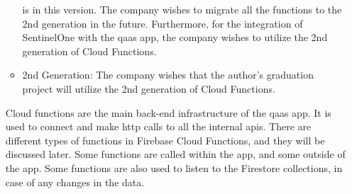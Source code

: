 \begin{itemize}
\begin{itemize}
                        is in this version. The company wishes to migrate all the functions to the 2nd generation in
                        the future. Furthermore, for the integration of SentinelOne with the \acrshort{qaas} app, the
                        company wishes to utilize the 2nd generation of Cloud Functions.
                  \item 2nd Generation: The company wishes that the author's graduation project will utilize the 2nd
                        generation of Cloud Functions.
            \end{itemize}
            Cloud functions are the main back-end infrastructure of the \acrshort{qaas} app. It is used to connect
            and make \acrshort{http} calls to all the internal \acrshort{api}s. There are different types of
            functions in Firebase Cloud Functions, and they will be discussed later. Some functions are called within
            the app, and some outside of the app. Some functions are also used to listen to the Firestore collections,
            in case of any changes in the data.
\end{itemize}

